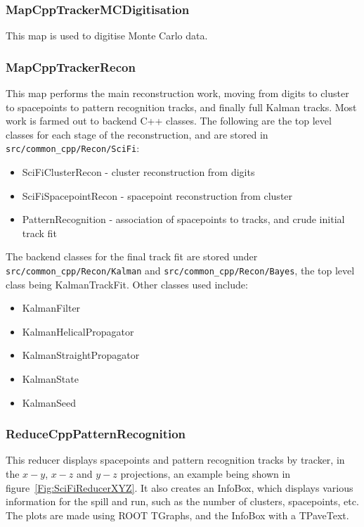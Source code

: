 \subsubsection{MapCppTrackerMCDigitisation}
This map is used to digitise Monte Carlo data.

\subsubsection{MapCppTrackerRecon}
This map performs the main reconstruction work, moving from digits to cluster to spacepoints to pattern recognition tracks, and finally full Kalman tracks. Most work is farmed out to backend C++ classes. The following are the top level classes for each stage of the reconstruction, and are stored in \verb;src/common_cpp/Recon/SciFi;:

\begin{itemize}
 \item SciFiClusterRecon - cluster reconstruction from digits
 \item SciFiSpacepointRecon - spacepoint reconstruction from cluster
 \item PatternRecognition - association of spacepoints to tracks, and crude initial track fit
\end{itemize}
The backend classes for the final track fit are stored under \verb;src/common_cpp/Recon/Kalman; and  \verb;src/common_cpp/Recon/Bayes;, the top level class being KalmanTrackFit. Other classes used include:

\begin{itemize}
 \item KalmanFilter
 \item KalmanHelicalPropagator
 \item KalmanStraightPropagator
 \item KalmanState
 \item KalmanSeed
\end{itemize}

\subsubsection{ReduceCppPatternRecognition}
This reducer displays spacepoints and pattern recognition tracks by tracker, in the $x-y$, $x-z$ and $y-z$ projections, an example being shown in figure~\ref{Fig:SciFiReducerXYZ}.  It also creates an InfoBox, which displays various information for the spill and run, such as the number of clusters, spacepoints, etc.  The plots are made using ROOT TGraphs, and the InfoBox with a TPaveText. 

